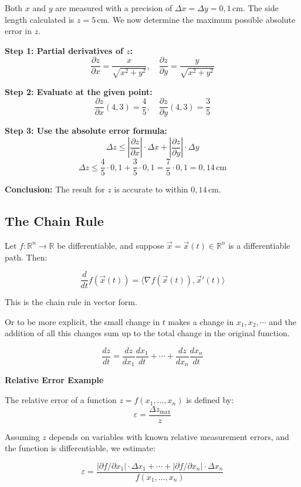 Both \( x \) and \( y \) are measured with a precision of \( \Delta x = \Delta y = 0{,}1 \, \text{cm} \). The side length calculated is \( z = 5 \, \text{cm} \). We now determine the maximum possible absolute error in \( z \).

\textbf{Step 1: Partial derivatives of \( z \):}
\[
\frac{\partial z}{\partial x} = \frac{x}{\sqrt{x^2 + y^2}}, \quad
\frac{\partial z}{\partial y} = \frac{y}{\sqrt{x^2 + y^2}}
\]

\textbf{Step 2: Evaluate at the given point:}
\[
\frac{\partial z}{\partial x}(4, 3) = \frac{4}{5}, \quad
\frac{\partial z}{\partial y}(4, 3) = \frac{3}{5}
\]

\textbf{Step 3: Use the absolute error formula:}
\[
\Delta z \leq \left| \frac{\partial z}{\partial x} \right| \cdot \Delta x + \left| \frac{\partial z}{\partial y} \right| \cdot \Delta y
\]
\[
\Delta z \leq \frac{4}{5} \cdot 0{,}1 + \frac{3}{5} \cdot 0{,}1 = \frac{7}{5} \cdot 0{,}1 = 0{,}14 \, \text{cm}
\]

\textbf{Conclusion:}  
The result for \( z \) is accurate to within \( \boxed{0{,}14 \, \text{cm}} \).


\subsection{The Chain Rule}

Let \( f : \mathbb{R}^n \to \mathbb{R} \) be differentiable, and suppose \( \vec{x} = \vec{x}(t) \in \mathbb{R}^n \) is a differentiable path. Then:

\[
\frac{d}{dt} f(\vec{x}(t)) = \langle \nabla f(\vec{x}(t)), \vec{x}'(t) \rangle
\]

This is the chain rule in vector form.

Or to be more explicit, the small change in \(t\) makes a change in \(x_1, x_2, \cdots\) and the addition of all this changes
sum up to the total change in the original function.

\[
\frac{dz}{dt} = \frac{dz}{dx_1}\frac{dx_1}{dt} + \cdots + \frac{dz}{dx_n}\frac{dx_n}{dt}
\]

\textbf{Relative Error Example}

The relative error of a function \( z = f(x_1, \dots, x_n) \) is defined by:
\[
\varepsilon = \frac{\Delta z_{\max}}{z}
\]

Assuming \( z \) depends on variables with known relative measurement errors, and the function is differentiable, we estimate:

\[
\varepsilon = \frac{|\partial f / \partial x_1| \cdot \Delta x_1 + \cdots + |\partial f / \partial x_n| \cdot \Delta x_n}{f(x_1, \dots, x_n)}
\]

